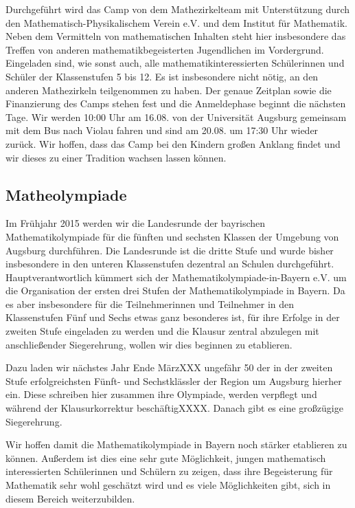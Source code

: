 \documentclass[12pt]{zettel}
\begin{document}
Durchgeführt wird das Camp von dem Mathezirkelteam mit Unterstützung
durch den Mathematisch-Physikalischem Verein e.V. und dem Institut für
Mathematik. Neben dem Vermitteln von mathematischen Inhalten steht hier
insbesondere das Treffen von anderen mathematikbegeisterten Jugendlichen
im Vordergrund. Eingeladen sind, wie sonst auch, alle
mathematikinteressierten Schülerinnen und Schüler der Klassenstufen 5
bis 12. Es ist insbesondere nicht nötig, an den anderen Mathezirkeln
teilgenommen zu haben. Der genaue Zeitplan sowie die Finanzierung des
Camps stehen fest und die Anmeldephase beginnt die nächsten Tage. Wir
werden 10:00 Uhr am 16.08. von der Universität Augsburg gemeinsam mit
dem Bus nach Violau fahren und sind am 20.08. um 17:30 Uhr wieder
zurück. Wir hoffen, dass das Camp bei den Kindern großen Anklang findet
und wir dieses zu einer Tradition wachsen lassen können.

\subsection{Matheolympiade}

Im Frühjahr 2015 werden wir die Landesrunde der bayrischen
Mathematikolympiade für die fünften und sechsten Klassen der Umgebung
von Augsburg durchführen. Die Landesrunde ist die dritte Stufe und wurde
bisher insbesondere in den unteren Klassenstufen dezentral an Schulen
durchgeführt. Hauptverantwortlich kümmert sich der
Mathematikolympiade-in-Bayern e.V. um die Organisation der ersten drei
Stufen der Mathematikolympiade in Bayern. Da es aber insbesondere für
die Teilnehmerinnen und Teilnehmer in den Klassenstufen Fünf und Sechs
etwas ganz besonderes ist, für ihre Erfolge in der zweiten Stufe
eingeladen zu werden und die Klausur zentral abzulegen mit
anschließender Siegerehrung, wollen wir dies beginnen zu etablieren.

Dazu laden wir nächstes Jahr Ende MärzXXX ungefähr 50 der in der zweiten
Stufe erfolgreichsten Fünft- und Sechstklässler der Region um Augsburg
hierher ein. Diese schreiben hier zusammen ihre Olympiade, werden
verpflegt und während der Klausurkorrektur beschäftigXXXX. Danach gibt
es eine großzügige Siegerehrung.

Wir hoffen damit die Mathematikolympiade in Bayern noch stärker
etablieren zu können. Außerdem ist dies eine sehr gute Möglichkeit,
jungen mathematisch interessierten Schülerinnen und Schülern zu zeigen,
dass ihre Begeisterung für Mathematik sehr wohl geschätzt wird und es
viele Möglichkeiten gibt, sich in diesem Bereich weiterzubilden.
\end{document}

